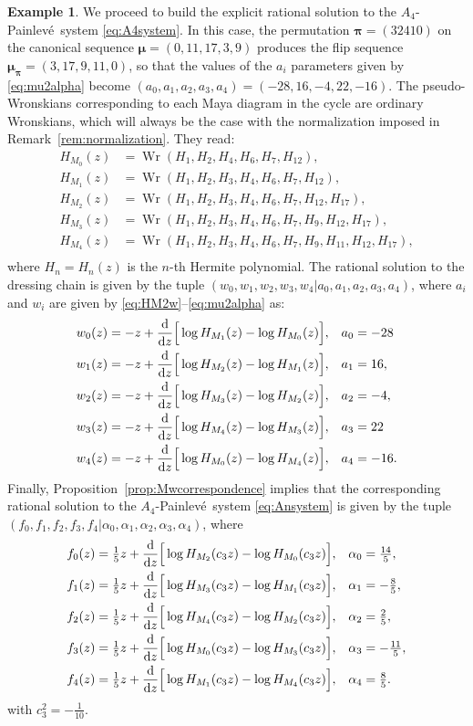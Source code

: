 \documentclass[10pt]{amsart}
\theoremstyle{definition}
\newtheorem{example}[thm]{Example}
\numberwithin{equation}{section}
\numberwithin{figure}{section}
\newcommand{\Wr}{\operatorname{Wr}}
\newcommand{\bmu}{{\boldsymbol{\mu}}}
\newcommand{\bpi}{{\boldsymbol{\pi}}}
\renewcommand{\H}{H}%
\newcommand{\ddz}{\frac{{\rm d}}{{\rm d}z}}
\newcommand{\p}{Painlev\'{e}}
\renewcommand{\a}{\alpha}
\newcommand{\cc}[1]{c_{#1}}
\begin{document}
\begin{example}
We proceed to build the explicit rational solution to the $A_4$-\p\ system \eqref{eq:A4system}. In this case, the permutation $\bpi=(32410)$ on the canonical sequence $\bmu=(0,11,17,3,9)$ produces the flip sequence $\bmu_\bpi=(3,17,9,11,0)$, so that the values of the $a_i$ parameters given by \eqref{eq:mu2alpha} become %
$(a_0,a_1,a_2,a_3,a_4)=(-28,16,-4,22,-16)$.
The pseudo-Wronskians corresponding to each Maya diagram in the cycle are ordinary Wronskians, which will always be the case with the normalization imposed in Remark~\ref{rem:normalization}. They read:
\begin{align*}
\H_{M_0}(z)&=\Wr(H_1,H_2,H_4,H_6,H_7,H_{12}),\\
\H_{M_1}(z)&=\Wr(H_1,H_2,H_3,H_4,H_6,H_7,H_{12}),\\
\H_{M_2}(z)&=\Wr(H_1,H_2,H_3,H_4,H_6,H_7,H_{12},H_{17}),\\
\H_{M_3}(z)&=\Wr(H_1,H_2,H_3,H_4,H_6,H_7,H_9,H_{12},H_{17}),\\
\H_{M_4}(z)&=\Wr(H_1,H_2,H_3,H_4,H_6,H_7,H_9,H_{11},H_{12},H_{17}),\\
\end{align*}
where $H_n=H_n(z)$ is the $n$-th Hermite polynomial. The rational solution to the dressing chain is given by the tuple $(w_0,w_1,w_2,w_3,w_4|a_0,a_1,a_2,a_3,a_4)$, where $a_i$ and $w_i$ are given by \eqref{eq:HM2w}--\eqref{eq:mu2alpha} as:
\begin{align*}
w_0(z)&=-z+\ddz\Big[\log \H_{M_1}(z) - \log \H_{M_0}(z)\Big],&& a_0=-28\\
w_1(z)&=-z+ \ddz\Big[\log \H_{M_2}(z) - \log \H_{M_1}(z)\Big],&& a_1=16,\\
w_2(z)&=-z+ \ddz\Big[\log \H_{M_3}(z) - \log \H_{M_2}(z)\Big],&& a_2=-4,\\
w_3(z)&=-z+ \ddz\Big[\log \H_{M_4}(z) - \log \H_{M_3}(z)\Big],&& a_3=22\\
w_4(z)&=-z+ \ddz\Big[\log \H_{M_0}(z) - \log \H_{M_4}(z)\Big],&& a_4=-16.
\end{align*}
Finally, Proposition~\ref{prop:Mwcorrespondence} implies that the corresponding rational solution to the $A_4$-\p\ system \eqref{eq:Ansystem} is given by the tuple $(f_0,f_1,f_2,f_3,f_4|\a_0,\a_1,\a_2,\a_3,\a_4)$, where
\begin{align*}
f_0(z)&=\tfrac15z+\ddz\Big[\log \H_{M_2}(\cc{3}z) - \log \H_{M_0}(\cc{3}z)\Big],&& \alpha_0=\tfrac{14}{5},\\
f_1(z)&=\tfrac15z+\ddz\Big[\log \H_{M_3}(\cc{3}z) -\log \H_{M_1}(\cc{3}z)\Big],&& \alpha_1=-\tfrac85,\\
f_2(z)&=\tfrac15z+ \ddz\Big[\log \H_{M_4}(\cc{3}z)-\log \H_{M_2}(\cc{3}z)\Big],&& \alpha_2=\tfrac25,\\
f_3(z)&=\tfrac15z+\ddz\Big[\log \H_{M_0}(\cc{3}z) - \log \H_{M_3}(\cc{3}z)\Big],&& \alpha_3=-\tfrac{11}5,\\
f_4(z)&=\tfrac15z+\ddz\Big[\log \H_{M_1}(\cc{3}z) - \log \H_{M_4}(\cc{3}z)\Big],&& \alpha_4=\tfrac85.
\end{align*}
with $\cc{3}^2=-\tfrac1{10}$.


\end{example}
\end{document}
